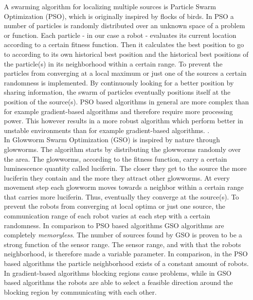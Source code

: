     A swarming algorithm for localizing multiple sources is Particle Swarm Optimization (PSO), which is originally inspired by flocks of birds.
    In PSO a number of particles is randomly distributed over an unknown space of a problem or function.
    Each particle - in our case a robot - evaluates its current location according to a certain fitness function.
    Then it calculates the best position to go to according to its own historical best position and the historical best positions of the particle(s) in its neighborhood within a certain range.
    To prevent the particles from converging at a local maximum or just one of the sources a certain randomness is implemented.
    By continuously looking for a better position by sharing information, the swarm of particles eventually positions itself at the position of the source(s). \cite{poli2007particle}
    PSO based algorithms in general are more complex than for example gradient-based algorithms and therefore require more processing power.
    This however results in a more robust algorithm which perform better in unstable environments than for example gradient-based algorithms. \cite{marques2006particle}.
    \\

    In Glowworm Swarm Optimization (GSO) is inspired by nature through glowworms.
    The algorithm starts by distributing the glowworms randomly over the area.
    The glowworms, according to the fitness function, carry a certain luminescence quantity called luciferin. 
    The closer they get to the source the more luciferin they contain and the more they attract other glowworms. 
    At every movement step each glowworm moves towards a neighbor within a certain range that carries more luciferin.
    Thus, eventually they converge at the source(s). 
    To prevent the robots from converging at local optima or just one source, the communication range of each robot varies at each step with a certain randomness.
    In comparison to PSO based algorithms GSO algorithms are completely \emph{memoryless}.
    The number of sources found by GSO is proven to be a strong function of the sensor range.
    The sensor range, and with that the robots neighborhood, is therefore made a variable parameter.
    In comparison, in the PSO based algorithms the particle neighborhood exists of a constant amount of robots.
    In gradient-based algorithms blocking regions cause problems, while in GSO based algorithms the robots are able to select a feasible direction around the blocking region by communicating with each other. \cite{krishnanand2005detection}\\

